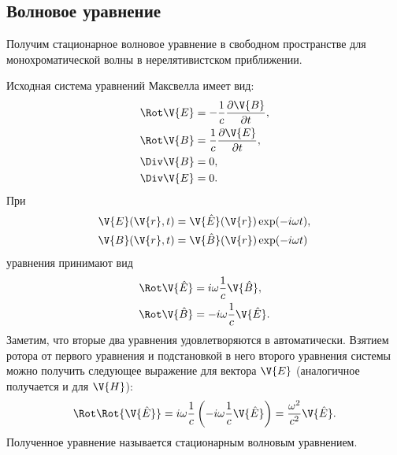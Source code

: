 %
%
%
%
%
%

\subsection{Волновое уравнение}

    Получим стационарное волновое уравнение в свободном пространстве для монохроматической волны в нерелятивистском приближении.

    Исходная система уравнений Максвелла имеет вид:
    \begin{equation}\begin{aligned}\label{eq:maxwell_empty_space}
        \Rot\V{E} &= - \frac{1}{c} \frac{\partial \V{B}}{\partial t}, \\
        \Rot\V{B} &= \frac{1}{c} \frac{\partial \V{E}}{\partial t}, \\
        \Div\V{B} &= 0, \\
        \Div\V{E} &= 0.
    \end{aligned}\end{equation}
    При
    \begin{equation}\begin{aligned}
        \V{E}(\V{r}, t) &= \V{\hat{E}}(\V{r}) \exp(- i \omega t), \\
        \V{B}(\V{r}, t) &= \V{\hat{B}}(\V{r}) \exp(- i \omega t)
    \end{aligned}\end{equation}
    уравнения принимают вид
    \begin{equation}\begin{aligned}
        \Rot\V{\hat{E}} &= i \omega \frac{1}{c} \V{\hat{B}}, \\
        \Rot\V{\hat{B}} &= - i \omega \frac{1}{c} \V{\hat{E}}.
    \end{aligned}\end{equation}
    Заметим, что вторые два уравнения удовлетворяются в автоматически. Взятием ротора от первого уравнения и подстановкой в него второго уравнения системы можно получить следующее выражение для вектора $\V{E}$ (аналогичное получается и для $\V{H}$):
    \begin{equation}
        \Rot\Rot{\V{\hat{E}}} = i \omega \frac{1}{c} \left( -i \omega \frac{1}{c} \V{\hat{E}} \right) = \frac{\omega^2}{c^2} \V{\hat{E}}.
    \end{equation}
    Полученное уравнение называется стационарным волновым уравнением.

